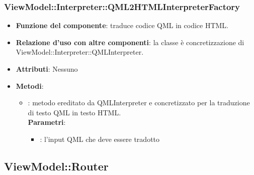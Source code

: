 \subsubsection{ViewModel::Interpreter::QML2HTMLInterpreterFactory}
\begin{itemize}
\item\textbf{Funzione del componente}: traduce codice QML in codice HTML.
	\item\textbf{Relazione d'uso con altre componenti}: la classe è concretizzazione di ViewModel::Interpreter::QMLInterpreter.\\
\item\textbf{Attributi}: Nessuno
\item\textbf{Metodi}:
	\begin{itemize}
		\item{}: metodo ereditato da QMLInterpreter e concretizzato per la traduzione di testo QML in testo HTML.\\
		\textbf{Parametri}:
			\begin{itemize}
				\item{}: l'input QML che deve essere tradotto \\
			\end{itemize}
	\end{itemize}
\end{itemize}

\subsection{ViewModel::Router}
